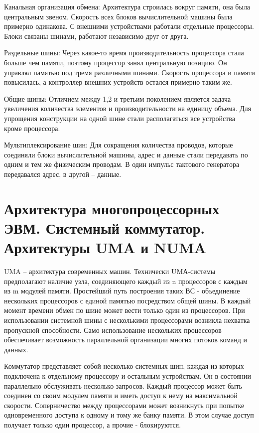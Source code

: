 \documentclass{article}
\begin{document}
Канальная организация обмена: Архитектура строилась вокруг памяти, она была центральным звеном. 
Скорость всех блоков вычислительной машины была примерно одинакова. С внешними устройствами работали отдельные процессоры. 
Блоки связаны шинами, работают независимо друг от друга. 


Раздельные шины: Через какое-то время производительность процессора стала больше чем памяти, поэтому процессор занял центральную позицию.
Он управлял памятью под тремя различными шинами. Скорость процессора и памяти повысилась, а контроллер внешних устройств остался примерно таким же. 


Общие шины: Отличием между 1,2 и третьим поколением является задача увеличения количества элементов и производительности на единицу объема. 
Для упрощения конструкции на одной шине стали располагаться все устройства кроме процессора. 


Мультиплексирование шин: Для сокращения количества проводов, которые соединяли блоки вычислительной машины, адрес и данные стали передавать по одним и тем же физическим проводам. 
В один импульс тактового генератора передавался адрес, в другой – данные. 


\section{Архитектура многопроцессорных ЭВМ. Системный коммутатор. Архитектуры UMA и NUMA}

UMA – архитектура современных машин. Технически UMА-системы предполагают наличие узла, 
соединяющего каждый из n процессоров с каждым из m модулей памяти. Простейший путь построения таких ВС - объединение нескольких процессоров с единой памятью посредством общей шины. 
В каждый момент времени обмен по шине может вести только один из процессоров. При использовании системной шины с несколькими процессорами возникла нехватка пропускной способности. 
Само использование нескольких процессоров обеспечивает возможность параллельной организации многих потоков команд и данных.

Коммутатор представляет собой несколько системных шин, каждая из которых подключена к отдельному процессору и остальным устройствам. 
Он в состоянии параллельно обслуживать несколько запросов. Каждый процессор может быть соединен со своим модулем памяти и иметь доступ к нему на максимальной скорости. 
Соперничество между процессорами может возникнуть при попытке одновременного доступа к одному и тому же банку памяти. 
В этом случае доступ получает только один процессор, а прочие - блокируются.
\end{document}

